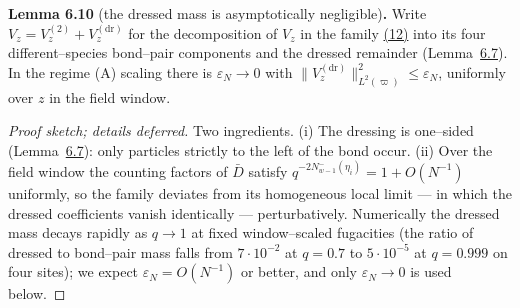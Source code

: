 \documentclass[11pt]{article}
\theoremstyle{plain}
\theoremstyle{definition}
\theoremstyle{remark}
\newcommand{\eps}{\varepsilon}\newcommand{\Exp}{\mathrm{Exp}}
\begin{document}
\label{lem_eps}\noindent\textbf{Lemma 6.10} (the dressed mass is asymptotically negligible)\textbf{.} 
Write $V_z=V_z^{(2)}+V_z^{(\mathrm{dr})}$ for the decomposition of $V_z$ in the
family \hyperref[eq_orthexact]{(12)} into its four different--species bond--pair components
and the dressed remainder (Lemma~\hyperref[lem_orth]{6.7}). In the regime (A) scaling there is
$\eps_N\to0$ with $\|V^{(\mathrm{dr})}_z\|^2_{L^2(\varpi)}\le\eps_N$, uniformly over
$z$ in the field window.
\par
\begin{proof}[Proof sketch; details deferred]
Two ingredients. (i) The dressing is one--sided (Lemma~\hyperref[lem_orth]{6.7}): only
particles strictly to the left of the bond occur. (ii) Over the field window the
counting factors of $\bar D$ satisfy $q^{-2N^-_{w-1}(\eta_i)}=1+O(N^{-1})$
uniformly, so the family deviates from its homogeneous local limit --- in which the
dressed coefficients vanish identically --- perturbatively. Numerically the dressed
mass decays rapidly as $q\to1$ at fixed window--scaled fugacities (the ratio of
dressed to bond--pair mass falls from $7\cdot10^{-2}$ at $q=0.7$ to $5\cdot10^{-5}$
at $q=0.999$ on four sites); we expect $\eps_N=O(N^{-1})$ or better, and only
$\eps_N\to0$ is used below.
\end{proof}
\end{document}
